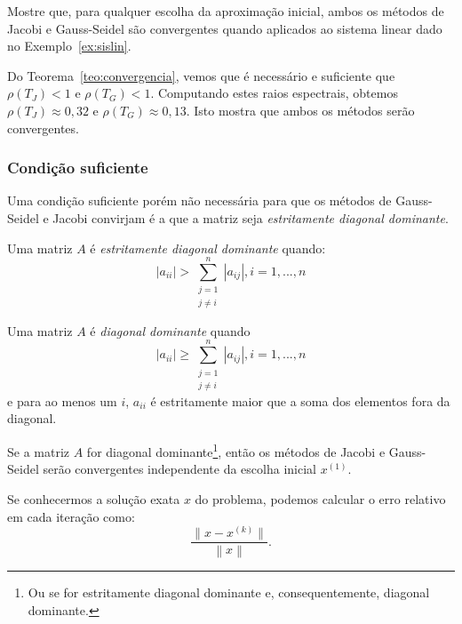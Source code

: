 \begin{ex}
  Mostre que, para qualquer escolha da aproximação inicial, ambos os métodos de Jacobi e Gauss-Seidel são convergentes quando aplicados ao sistema linear dado no Exemplo~\ref{ex:sislin}.
\end{ex}
\begin{sol}
  Do Teorema~\ref{teo:convergencia}, vemos que é necessário e suficiente que $\rho(T_J) < 1$ e $\rho(T_G) < 1$. Computando estes raios espectrais, obtemos $\rho(T_J) \approx 0,32$ e $\rho(T_G) \approx 0,13$. Isto mostra que ambos os métodos serão convergentes.
\end{sol}

\subsubsection{Condição suficiente}

Uma condição suficiente porém não necessária para que os métodos de Gauss-Seidel e Jacobi convirjam é a que a matriz seja \emph{estritamente diagonal dominante}.

\begin{defn}
 Uma matriz $A$ é \emph{estritamente diagonal dominante} quando:
\begin{equation*}
  \left |a_{ii}\right |> \sum_{\substack{j=1\\j\ne i}}^{n} \left |a_{ij}\right |, i=1,...,n
\end{equation*}
\end{defn}

\begin{defn}
 Uma matriz $A$ é \emph{diagonal dominante} quando
\begin{equation*}
  \left |a_{ii}\right | \geq \sum_{\substack{j=1\\j\ne i}}^{n} \left |a_{ij}\right |, i=1,...,n
\end{equation*}
e para ao menos um $i$, $a_{ii}$ é estritamente maior que a soma dos elementos fora da diagonal.
\end{defn}

\begin{teo}
 Se a matriz $A$ for diagonal dominante\footnote{Ou se for estritamente diagonal dominante e, consequentemente, diagonal dominante.}, então os métodos de Jacobi e Gauss-Seidel serão convergentes independente da escolha inicial $x^{(1)}$.
\end{teo}

Se conhecermos a solução exata $x$ do problema, podemos calcular o erro relativo em cada iteração como:
\begin{equation*}
   \frac{ \|x-x^{(k)}\|}{\left\|x\right\|}.
\end{equation*}

